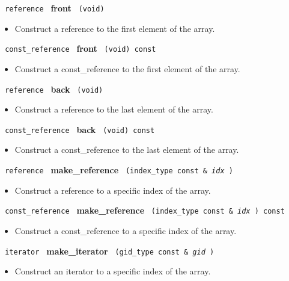 \noindent
\texttt{%
reference
}
\textbf{front}%
\texttt{%
(void)
}

\begin{itemize}
\item
Construct a reference to the first element of the array.
\end{itemize}
 
\noindent
\texttt{%
const\_reference
}
\textbf{front}%
\texttt{%
(void) const
}

\begin{itemize}
\item
Construct a const\_reference to the first element of the array.
\end{itemize}
 
\noindent
\texttt{%
reference
}
\textbf{back}%
\texttt{%
(void)
}

\begin{itemize}
\item
Construct a reference to the last element of the array.
\end{itemize}
 
\noindent
\texttt{%
const\_reference
}
\textbf{back}%
\texttt{%
(void) const
}

\begin{itemize}
\item
Construct a const\_reference to the last element of the array.
\end{itemize}
 
\noindent
\texttt{%
reference
}
\textbf{make\_reference}%
\texttt{%
(index\_type const \&
\textit{idx}%
)
}

\begin{itemize}
\item
Construct a reference to a specific index of the array.
\end{itemize}
 
\noindent
\texttt{%
const\_reference
}
\textbf{make\_reference}%
\texttt{%
(index\_type const \&
\textit{idx}%
) const
}

\begin{itemize}
\item
Construct a const\_reference to a specific index of the array.
\end{itemize}
 
\noindent
\texttt{%
iterator
}
\textbf{make\_iterator}%
\texttt{%
(gid\_type const \&
\textit{gid}%
)
}

\begin{itemize}
\item
Construct an iterator to a specific index of the array.
\end{itemize}
 
